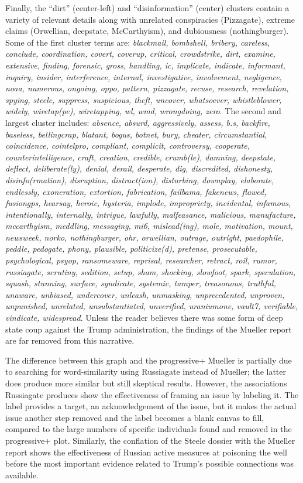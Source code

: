 \documentclass[doublespacing]{utdthesis}
\begin{document}
Finally, the  ``dirt'' (center-left) and ``disinformation'' (center) clusters contain a variety of relevant details along with unrelated conspiracies (Pizzagate), extreme claims (Orwellian, deepstate, McCarthyism), and dubiousness (nothingburger).
Some of the first cluster terms are: \emph{blackmail, bombshell, bribery, careless, conclude, coordination, covert, coverup, critical, crowdstrike, dirt, examine, extensive, finding, forensic, gross, handling, ic, implicate, indicate, informant, inquiry, insider, interference, internal, investigative, involvement, negligence, noaa, numerous, ongoing, oppo, pattern, pizzagate, recuse, research, revelation, spying, steele, suppress, suspicious, theft, uncover, whatsoever, whistleblower, widely, wiretap(pe), wiretapping, wl, wmd, wrongdoing, zero}.
The second and largest cluster includes: \emph{absence, absurd, aggressively, assess, b.s, backfire, baseless, bellingcrap, blatant, bogus, botnet, bury, cheater, circumstantial, coincidence, cointelpro, compliant, complicit, controversy, cooperate, counterintelligence, craft, creation, credible, crumb(le), damning, deepstate, deflect, deliberate(ly), denial, derail, desperate, dig, discredited, dishonesty, disinfo(rmation), disruption, distract(ion), disturbing, downplay, elaborate, endlessly, exoneration, extortion, fabrication, failbama, fakenews, flawed, fusiongps, hearsay, heroic, hysteria, implode, impropriety, incidental, infamous, intentionally, internally, intrigue, lawfully, malfeasance, malicious, manufacture, mccarthyism, meddling, messaging, mi6, mislead(ing), mole, motivation, mount, newsweek, norko, nothingburger, ohr, orwellian, outrage, outright, paedophile, peddle, pedogate, phony, plausible, politicize(d), pretense, prosecutable, psychological, psyop, ransomeware, reprisal, researcher, retract, roil, rumor, russiagate, scrutiny, sedition, setup, sham, shocking, slowfoot, spark, speculation, squash, stunning, surface, syndicate, systemic, tamper, treasonous, truthful, unaware, unbiased, undercover, unleash, unmasking, unprecedented, unproven, unpunished, unrelated, unsubstantiated, unverified, uraniumone, vault7, verifiable, vindicate, widespread}.
Unless the reader believes there was some form of deep state coup against the Trump administration, the findings of the Mueller report are far removed from this narrative.

The difference between this graph and the progressive+ Mueller is partially due to searching for word-similarity using Russiagate instead of Mueller; the latter does produce more similar but still skeptical results.
However, the associations Russiagate produces show the effectiveness of framing an issue by labeling it.
The label provides a target, an acknowledgement of the issue, but it makes the actual issue another step removed and the label becomes a blank canvas to fill, compared to the large numbers of specific individuals found and removed in the progressive+ plot.
Similarly, the conflation of the Steele dossier with the Mueller report shows the effectiveness of Russian active measures at poisoning the well before the most important evidence related to Trump's possible connections was available.
\end{document}
